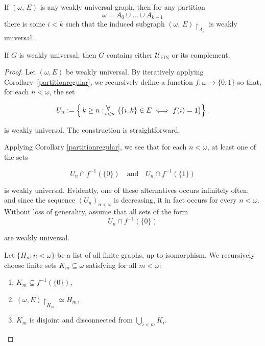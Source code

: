 \documentclass[10pt,a4paper]{amsart}
\DeclareMathOperator{\fin}{FIN}
\newcommand{\UU}{\mathcal{U}}
\begin{document}
\begin{cor}\label{partitionregular}
    If $(\omega,\,E)$ is any weakly universal graph, then for any partition
    $$\omega=A_0\cup \ldots \cup A_{k-1}$$
    there is some $i<k$ such that the induced subgraph $(\omega, \, E)\restriction_{A_i}$ is weakly universal.
\end{cor}

\begin{theorem}\label{t:BasisThm} If $G$ is weakly universal, then $G$ contains either $\UU_{\fin}$ or its complement. \end{theorem}

\begin{proof}
Let \((\omega, E)\) be weakly universal.  
By iteratively applying Corollary~\ref{partitionregular}, we recursively define a function
\(f\colon \omega \longrightarrow \{0,1\}\) so that, for each \(n<\omega\), the set


    \[
U_n := 
\left\{\,k\ge n :
  \mathrel{\vcenter{\hbox{%
    $\displaystyle
      \mathop{\scalebox{1.1}{$\forall$}}_{\,\scriptstyle i<n}$
  }}}%
  \!\!\!\;\bigl(\{i,k\}\in E \iff f(i)=1\bigr)
\right\}.
\]

is weakly universal.  
The construction is straightforward.

Applying Corollary \ref{partitionregular}, we see that for each $n<\omega$, at least one of the sets


\[
U_{n}\cap f^{-1}(\{0\})
\quad\text{and}\quad
U_{n}\cap f^{-1}(\{1\})
\]


is weakly universal.  
Evidently, one of these alternatives occurs infinitely often; and since the sequence \((U_{n})_{n<\omega}\) is decreasing, it in fact occurs for every \(n<\omega\).  
Without loss of generality, assume that all sets of the form
\[
U_{n}\cap f^{-1}(\{0\})
\]

are weakly universal.

Let \(\{H_{n} : n<\omega\}\) be a list of all finite graphs, up to isomorphism.  
We recursively choose finite sets \(K_{m}\subseteq \omega\) satisfying for all \(m<\omega\):
\begin{enumerate}
  \item \(K_{m}\subseteq f^{-1}(\{0\})\),
  \item \((\omega, E)\restriction_{K_{m}} \simeq H_{m}\),
  \item $K_m$ is disjoint and disconnected from $\bigcup\limits_{i<m}K_i.$
\end{enumerate}


\end{proof}
\end{document}
